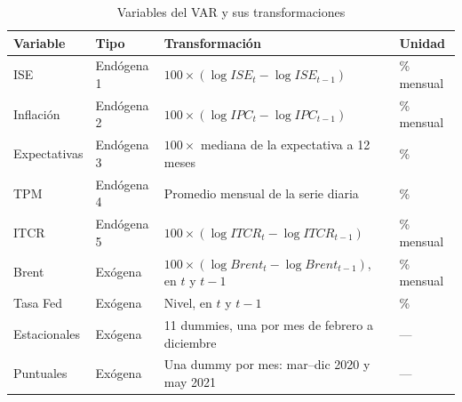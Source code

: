 \begin{table}[H]
\centering
\caption{Variables del VAR y sus transformaciones}
\label{tab:transformaciones}
\small
\begin{tabular}{@{}llll@{}}
\toprule
Variable & Tipo & Transformación & Unidad \\
\midrule
ISE & Endógena 1 & $100 \times (\log ISE_t - \log ISE_{t-1})$ & \% mensual \\
Inflación & Endógena 2 & $100 \times (\log IPC_t - \log IPC_{t-1})$ & \% mensual \\
Expectativas & Endógena 3 & $100 \times$ mediana de la expectativa a 12 meses & \% \\
TPM & Endógena 4 & Promedio mensual de la serie diaria & \% \\
ITCR & Endógena 5 & $100 \times (\log ITCR_t - \log ITCR_{t-1})$ & \% mensual \\
Brent & Exógena & $100 \times (\log Brent_t - \log Brent_{t-1})$, en $t$ y $t-1$ & \% mensual \\
Tasa Fed & Exógena & Nivel, en $t$ y $t-1$ & \% \\
Estacionales & Exógena & 11 dummies, una por mes de febrero a diciembre & --- \\
Puntuales & Exógena & Una dummy por mes: mar--dic 2020 y may 2021 & --- \\
\bottomrule
\end{tabular}
\end{table}

